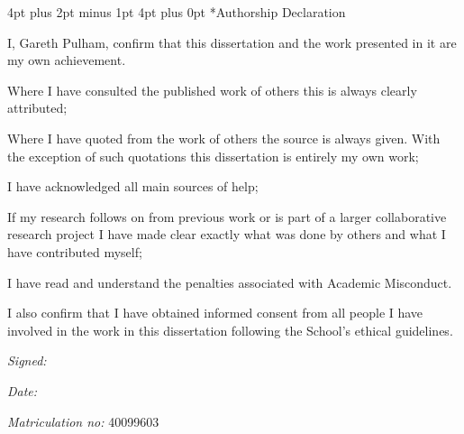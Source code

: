 \documentclass[12pt,a4paper]{article}
\makeatletter
\renewcommand\section{\@startsection {section}{1}{0mm} %
                               {4pt plus 2pt minus 1pt} %
                               {4pt plus 0pt} %
                               {\bfseries}}
\makeatother
\begin{document}
\section*{Authorship Declaration}
\vspace{0.5cm}
\begin{flushleft}
I, Gareth Pulham, confirm that this dissertation and the work presented in it are my own achievement.\newline

Where I have consulted the published work of others this is always clearly attributed;\newline

Where I have quoted from the work of others the source is always given. With the exception of such quotations this
dissertation is entirely my own work;\newline

I have acknowledged all main sources of help; \newline

If my research follows on from previous work or is part of a larger collaborative research project I have made clear
exactly what was done by others and what I have contributed myself;\newline

I have read and understand the penalties associated with Academic Misconduct.\newline

I also confirm that I have obtained informed consent from all people I have involved in the work in this dissertation
following the School's ethical guidelines.\newline
\end{flushleft}

\begin{flushleft} \large
\emph{Signed:} \\
\end{flushleft}

\vspace{.5cm}

\begin{flushleft} \large
\emph{Date:} \\
\end{flushleft}

\vspace{.5cm}

\begin{flushleft} \large
\emph{Matriculation no: } 40099603 \\
\end{flushleft}
\end{document}
